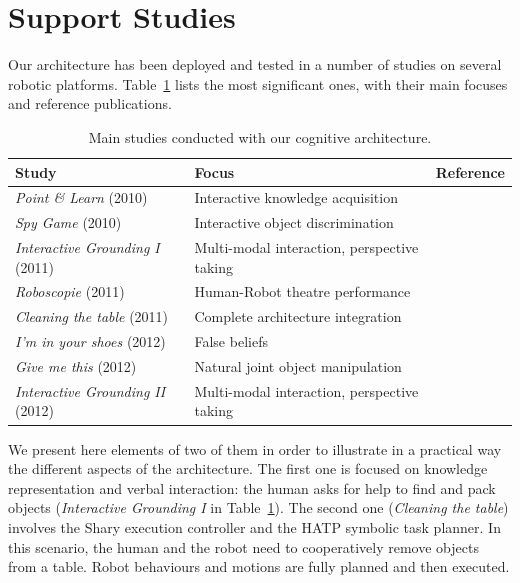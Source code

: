 \documentclass[preprint,3p,times]{elsarticle}
\begin{document}
\section{Support Studies}
\label{sec:expe}

Our architecture has been deployed and tested in a number of studies on
several robotic platforms. Table~\ref{table|experiments} lists the most
significant ones, with their main focuses and reference publications.

\begin{table}
\begin{center}

\begin{tabular}{lll}
 \bf{Study} & Focus & Reference \\
\hline
{\it Point \& Learn} (2010) & Interactive knowledge acquisition & \cite{Lemaignan2010} \\
{\it Spy Game} (2010) & Interactive object discrimination & \cite{Ros2010b} \\
{\it Interactive Grounding I} (2011) & Multi-modal interaction, perspective taking & \cite{lemaignan2011what} \\
{\it Roboscopie} (2011) & Human-Robot theatre performance & \cite{lemaignan2012roboscopie} \\
{\it Cleaning the table} (2011) & Complete architecture integration & \cite{Alami2011} \\
{\it I'm in your shoes} (2012) & False beliefs & \cite{warnier2012when} \\
{\it Give me this} (2012) & Natural joint object manipulation & \cite{gharbi2013natural} \\
{\it Interactive Grounding II} (2012) & Multi-modal interaction, perspective taking & \cite{lemaignan2013talking} \\
\hline

\end{tabular}
\end{center}
\caption{Main studies conducted with our cognitive architecture.}
\label{table|experiments}
\end{table}

We present here elements of two of them in order to illustrate in a practical way
the different aspects of the architecture.  The first one is focused on knowledge
representation and verbal interaction: the human asks for help to find and pack
objects ({\it Interactive Grounding I} in Table~\ref{table|experiments}). The
second one ({\it Cleaning the table}) involves the {\sc Shary} execution
controller and the HATP symbolic task planner. In this scenario, the human and
the robot need to cooperatively remove objects from a table. Robot behaviours and
motions are fully planned and then executed.
\end{document}
